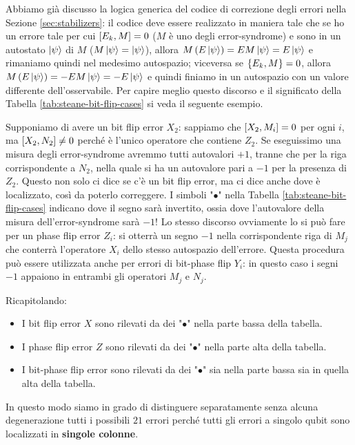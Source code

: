 \noindent Abbiamo già discusso la logica generica del codice di correzione degli errori nella Sezione \ref{sec:stabilizers}: il codice deve essere realizzato in maniera tale che se ho un errore tale per cui $\comm{E_k}{M}=0$ ($M$ è uno degli error-syndrome) e sono in un autostato $\ket{\psi}$ di $M$ ($M\ket \psi = \ket \psi$), allora $M\left(E\ket \psi\right)=EM\ket \psi=E\ket\psi$ e rimaniamo quindi nel medesimo autospazio; viceversa se $\acomm{E_k}{M}=0$, allora $M\left(E\ket \psi\right)=-EM\ket \psi=-E\ket\psi$ e quindi finiamo in un autospazio con un valore differente dell'osservabile. Per capire meglio questo discorso e il significato della Tabella \ref{tab:steane-bit-flip-cases} si veda il seguente esempio. 

\begin{esempio}
    Supponiamo di avere un bit flip error $X_2$: sappiamo che $\comm{X_2}{M_i}=0$ per ogni $i$, ma $\comm{X_2}{N_2}\neq 0$ perché è l'unico operatore che contiene $Z_2$. Se eseguissimo una misura degli error-syndrome avremmo tutti autovalori $+1$, tranne che per la riga corrispondente a $N_2$, nella quale si ha un autovalore pari a $-1$ per la presenza di $Z_2$. Questo non solo ci dice se c'è un bit flip error, ma ci dice anche dove è localizzato, così da poterlo correggere. I simboli "$\bullet$" nella Tabella \ref{tab:steane-bit-flip-cases} indicano dove il segno sarà invertito, ossia dove l'autovalore della misura dell'error-syndrome sarà $-1$! Lo stesso discorso ovviamente lo si può fare per un phase flip error $Z_i$: si otterrà un segno $-1$ nella corrispondente riga di $M_j$ che conterrà l'operatore $X_i$ dello stesso autospazio dell'errore. Questa procedura può essere utilizzata anche per errori di bit-phase flip $Y_i$: in questo caso i segni $-1$ appaiono in entrambi gli operatori $M_j$ e $N_j$. 
\end{esempio}

\noindent Ricapitolando: 
\begin{itemize}
    \item I bit flip error $X$ sono rilevati da dei "$\bullet$" nella parte bassa della tabella.
    
    \item I phase flip error $Z$ sono rilevati da dei "$\bullet$" nella parte alta della tabella.
    
    \item I bit-phase flip error sono rilevati da dei "$\bullet$" sia nella parte bassa sia in quella alta della tabella.
\end{itemize}
In questo modo siamo in grado di distinguere separatamente senza alcuna degenerazione tutti i possibili $21$ errori perché tutti gli errori a singolo qubit sono localizzati in \textbf{singole colonne}. 

